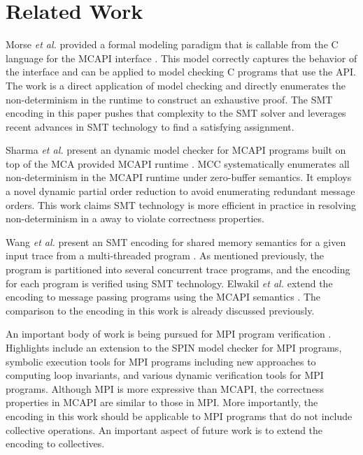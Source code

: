 \section{Related Work}
Morse \emph{et al.} provided a formal modeling paradigm that is callable from
the C language for the MCAPI interface \cite{morse:vmcai12}. This
model correctly captures the behavior of the interface and can be
applied to model checking C programs that use the API. The work is a
direct application of model checking and directly enumerates the
non-determinism in the runtime to construct an exhaustive proof. The
SMT encoding in this paper pushes that complexity to the SMT solver
and leverages recent advances in SMT technology to find a satisfying
assignment.

Sharma \emph{et al.} present an dynamic model checker for MCAPI programs built
on top of the MCA provided MCAPI runtime \cite{sharma:fmcad09}. MCC
systematically enumerates all non-determinism in the MCAPI runtime
under zero-buffer semantics. It employs a novel dynamic partial order
reduction to avoid enumerating redundant message orders. This work
claims SMT technology is more efficient in practice in resolving
non-determinism in a away to violate correctness properties.

Wang \emph{et al.} present an SMT encoding for shared memory semantics for a
given input trace from a multi-threaded program \cite{wang:fse09}. As
mentioned previously, the program is partitioned into several
concurrent trace programs, and the encoding for each program is
verified using SMT technology. Elwakil \emph{et al.} extend the encoding to
message passing programs using the MCAPI semantics
\cite{elwakil:atva10,elwakil:padtad10}. The comparison to the encoding
in this work is already discussed previously.

An important body of work is being pursued for MPI program
verification \cite{siegel-zirkel:2012:loops,
  siegel-zirkel:2011:ppopp,siegel-gopalakrishnan:2011:vmcai,siegel:2007:tutorial,DBLP:conf/ptw/VoVG09,sarvani:fm09,flanagan:popl05}.
Highlights include an extension to the SPIN model checker for MPI
programs, symbolic execution tools for MPI programs including new
approaches to computing loop invariants, and various dynamic
verification tools for MPI programs. Although MPI is more expressive than MCAPI, the correctness
properties in MCAPI are similar to those in MPI. More importantly, the
encoding in this work should be applicable to MPI programs that do not
include collective operations. An important aspect of future work is
to extend the encoding to collectives. 

